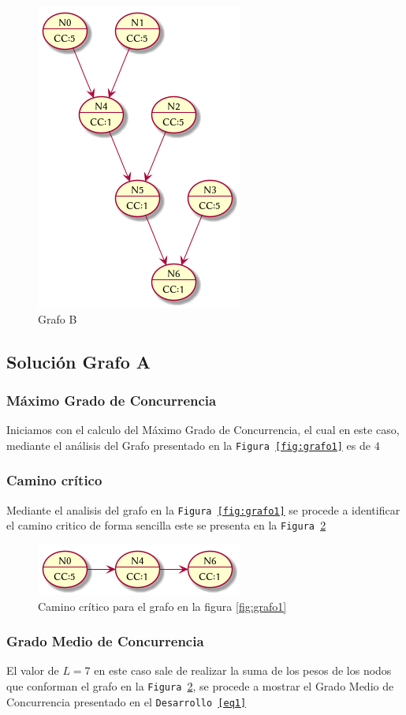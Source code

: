 \documentclass{article}
\begin{document}
\begin{figure}[H]
  \centering
  \includegraphics[width=.4\linewidth]{grafo2}
  \caption{Grafo B}
  \label{fig:grafo2}
\end{figure}

\subsection{Soluci\'on Grafo A}
\label{pnt:sgra}
\subsubsection{M\'aximo Grado de Concurrencia}
Iniciamos con el calculo del M\'aximo Grado de Concurrencia, el cual en este
caso, mediante el an\'alisis del Grafo presentado en la \texttt{Figura
\ref{fig:grafo1}} es de $4$

\subsubsection{Camino cr\'itico}
Mediante el analisis del grafo en la \texttt{Figura
\ref{fig:grafo1}} se procede a identificar el camino critico de forma sencilla
este se presenta en la \texttt{Figura \ref{fig:cc1}}
\begin{figure}[H]
  \centering
  \includegraphics[width=.4\linewidth]{grafo1_cc}
  \caption{Camino cr\'itico para el grafo en la figura \ref{fig:grafo1}}
  \label{fig:cc1}
\end{figure}

\subsubsection{Grado Medio de Concurrencia}
El valor de $L=7$ en este caso sale de realizar la suma de los pesos de los
nodos que conforman el grafo en la \texttt{Figura \ref{fig:cc1}}, se procede a mostrar
el Grado Medio de Concurrencia presentado en el \texttt{Desarrollo \ref{eq1}}
\end{document}
